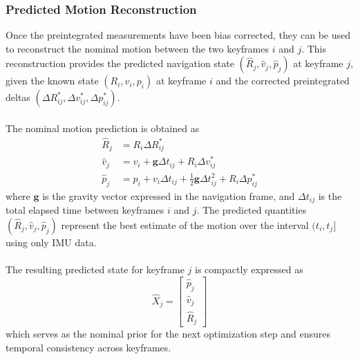 \subsubsection{Predicted Motion Reconstruction}
Once the preintegrated measurements have been bias corrected, they can be used to reconstruct the nominal motion between the two keyframes $i$ and $j$. This reconstruction provides the predicted navigation state $(\hat{R}_j, \hat{v}_j, \hat{p}_j)$ at keyframe $j$, given the known state $(R_i, v_i, p_i)$ at keyframe $i$ and the corrected preintegrated deltas $(\Delta R_{ij}^{*}, \Delta v_{ij}^{*}, \Delta p_{ij}^{*})$.
\\ \\
The nominal motion prediction is obtained as
$$
    \begin{aligned}
        \hat{R}_j &= R_i \Delta R_{ij}^{*} \\
        \hat{v}_j &= v_i + \mathbf{g}\Delta t_{ij} + R_i \Delta v_{ij}^{*} \\
        \hat{p}_j &= p_i + v_i\Delta t_{ij} + \tfrac{1}{2}\mathbf{g}\Delta t_{ij}^2 + R_i \Delta p_{ij}^{*}
    \end{aligned}
$$
where $\mathbf{g}$ is the gravity vector expressed in the navigation frame, and $\Delta t_{ij}$ is the total elapsed time between keyframes $i$ and $j$. The predicted quantities $(\hat{R}_j, \hat{v}_j, \hat{p}_j)$ represent the best estimate of the motion over the interval $(t_i, t_j]$ using only IMU data.
\\ \\
The resulting predicted state for keyframe $j$ is compactly expressed as
$$
    \hat{X}_j =
    \begin{bmatrix}
        \hat{p}_j \\
        \hat{v}_j \\
        \hat{R}_j
    \end{bmatrix}
$$
which serves as the nominal prior for the next optimization step and ensures temporal consistency across keyframes.



